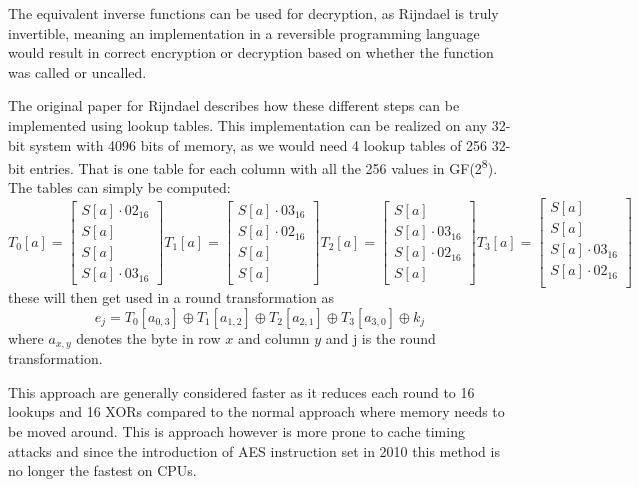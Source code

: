 \documentclass[a4paper]{article}
\begin{document}
The equivalent inverse functions can be used for decryption, as Rijndael is truly invertible, meaning an implementation in a reversible programming language would result in correct encryption or decryption based on whether the function was called or uncalled.

The original paper for Rijndael\cite{Rijndael} describes how these different steps can be implemented using lookup tables. This implementation can be realized on any 32-bit system with 4096 bits of memory, as we would need 4 lookup tables of 256 32-bit entries. That is one table for each column with all the 256 values in GF(2\textsuperscript{8}). The tables can simply be computed:
\begin{equation}
T_0[a] = \begin{bmatrix}
          S[a] \cdot 02_{16}\\
          S[a]\\
          S[a]\\
          S[a] \cdot 03_{16}
\end{bmatrix}
T_1[a] = \begin{bmatrix}
          S[a] \cdot 03_{16}\\
          S[a] \cdot 02_{16}\\
          S[a]\\
          S[a]
\end{bmatrix}
T_2[a] = \begin{bmatrix}
          S[a]\\
          S[a] \cdot 03_{16}\\
          S[a] \cdot 02_{16}\\
          S[a]
\end{bmatrix}
T_3[a] = \begin{bmatrix}
          S[a]\\
          S[a]\\
          S[a] \cdot 03_{16}\\
          S[a] \cdot 02_{16}\\
\end{bmatrix}
\end{equation}
these will then get used in a round transformation as
\begin{equation}
e_j = T_0 [a_{0,3}] \oplus T_1 [a_{1,2}] \oplus T_2 [a_{2,1}] \oplus T_3 [a_{3,0}] \oplus k_j
\end{equation}
where \(a_{x,y}\) denotes the byte in row \(x\) and column \(y\) and j is the round transformation.

This approach are generally considered faster as it reduces each round to 16 lookups and 16 XORs compared to the normal approach where memory needs to be moved around. This is approach however is more prone to cache timing attacks and since the introduction of AES instruction set in 2010 this method is no longer the fastest on CPUs.
\end{document}
